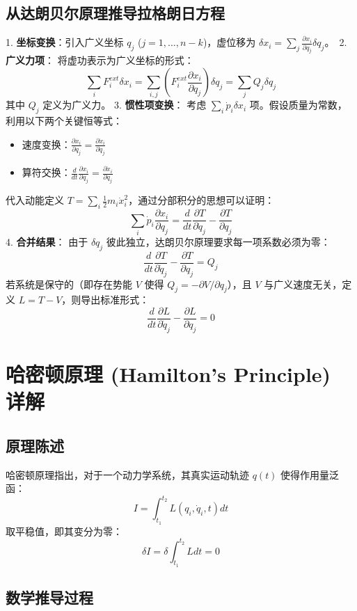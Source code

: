 \documentclass[11pt,a4paper]{article}
\begin{document}
\subsection{从达朗贝尔原理推导拉格朗日方程}
1. \textbf{坐标变换}：引入广义坐标 $q_j$ ($j=1, \dots, n-k$)，虚位移为 $\delta x_i = \sum_j \frac{\partial x_i}{\partial q_j} \delta q_j$。\
2. \textbf{广义力项}：
   将虚功表示为广义坐标的形式：
   \[ \sum_i F_i^{ext} \delta x_i = \sum_{i,j} \left( F_i^{ext} \frac{\partial x_i}{\partial q_j} \right) \delta q_j = \sum_j Q_j \delta q_j \]
   其中 $Q_j$ 定义为广义力。
3. \textbf{惯性项变换}：
   考虑 $\sum_i \dot{p}_i \delta x_i$ 项。假设质量为常数，利用以下两个关键恒等式：
   \begin{itemize}
       \item 速度变换：$\frac{\partial x_i}{\partial q_j} = \frac{\partial \dot{x}_i}{\partial \dot{q}_j}$
       \item 算符交换：$\frac{d}{dt} \frac{\partial x_i}{\partial q_j} = \frac{\partial \dot{x}_i}{\partial q_j}$
   \end{itemize}
   代入动能定义 $T = \sum_i \frac{1}{2}m_i \dot{x}_i^2$，通过分部积分的思想可以证明：
   \[ \sum_i \dot{p}_i \frac{\partial x_i}{\partial q_j} = \frac{d}{dt} \frac{\partial T}{\partial \dot{q}_j} - \frac{\partial T}{\partial q_j} \]
4. \textbf{合并结果}：
   由于 $\delta q_j$ 彼此独立，达朗贝尔原理要求每一项系数必须为零：
   \[ \frac{d}{dt}\frac{\partial T}{\partial\dot{q}_{j}}-\frac{\partial T}{\partial q_{j}}=Q_{j} \]
   若系统是保守的（即存在势能 $V$ 使得 $Q_j = -\partial V / \partial q_j$），且 $V$ 与广义速度无关，定义 $L=T-V$，则导出标准形式：
   \[ \boxed{\frac{d}{dt}\frac{\partial L}{\partial\dot{q}_{j}}-\frac{\partial L}{\partial q_{j}}=0} \]

\section*{哈密顿原理 (Hamilton's Principle) 详解}

\subsection{原理陈述}
哈密顿原理指出，对于一个动力学系统，其真实运动轨迹 $q(t)$ 使得作用量泛函：
\[ I = \int_{t_1}^{t_2} L(q_i, \dot{q}_i, t) dt \]
取平稳值，即其变分为零：
\[ \delta I = \delta \int_{t_1}^{t_2} L dt = 0 \]

\subsection{数学推导过程}
\end{document}
